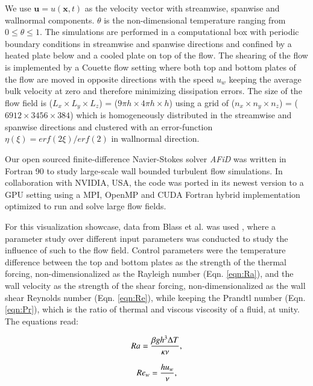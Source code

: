 \documentclass[final,5p,times,twocolumn]{elsarticle}
\begin{document}
We use $ \boldsymbol{u}=u(\boldsymbol{x},t) $ as the velocity vector with streamwise, spanwise and wallnormal components. $ \theta $ is the non-dimensional temperature ranging from $ 0 \leq \theta \leq 1 $. The simulations are performed in a computational box with periodic boundary conditions in streamwise and spanwise directions and confined by a heated plate below and a cooled plate on top of the flow. The shearing of the flow is implemented by a Couette flow setting where both top and bottom plates of the flow are moved in opposite directions with the speed $ u_w $ keeping the average bulk velocity at zero and therefore minimizing dissipation errors. The size of the flow field is ($ L_x \times L_y \times L_z $) = ($ 9\pi h \times 4\pi h \times h $) using a grid of ($ n_x \times n_y \times n_z $) = ($ 6912 \times 3456 \times 384 $) which is homogeneously distributed in the streamwise and spanwise directions and clustered with an error-function $ \eta(\xi)=erf(2\xi)/erf(2) $ in wallnormal direction.

Our open sourced finite-difference Navier-Stokes solver \textit{AFiD} \cite{poe15c} was written in Fortran 90 to study large-scale wall bounded turbulent flow simulations. In collaboration with NVIDIA, USA, the code was ported in its newest version to a GPU setting using a MPI, OpenMP and CUDA Fortran hybrid implementation optimized to run and solve large flow fields.

For this visualization showcase, data from Blass et al. was used \cite{bla18}, where a parameter study over different input parameters was conducted to study the influence of such to the flow field. Control parameters were the temperature difference between the top and bottom plates as the strength of the thermal forcing, non-dimensionalized as the Rayleigh number (Eqn. \ref{eqn:Ra}), and the wall velocity as the strength of the shear forcing, non-dimensionalized as the wall shear Reynolds number (Eqn. \ref{eqn:Re}), while keeping the Prandtl number (Eqn. \ref{eqn:Pr}), which is the ratio of thermal and viscous viscosity of a fluid, at unity. The equations read:

\begin{equation} %
Ra= \frac{\beta gh^3\Delta T}{\kappa\nu}, 
\label{eqn:Ra} \\[8pt]
\end{equation}

\begin{equation} %
Re_w= \frac{hu_w}{\nu},
\label{eqn:Re} \\[8pt]
\end{equation}
\end{document}
